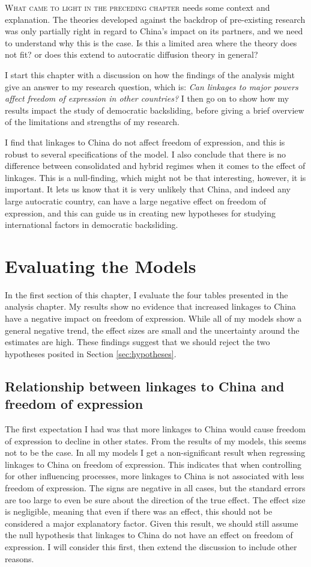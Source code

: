 \lettrine{W}{hat came to light in the preceding chapter} needs some context and explanation. The theories developed against the backdrop of pre-existing research was only partially right in regard to China's impact on its partners, and we need to understand why this is the case. Is this a limited area where the theory does not fit? or does this extend to autocratic diffusion theory in general?

I start this chapter with a discussion on how the findings of the analysis might give an answer to my research question, which is: \textit{Can linkages to major powers affect freedom of expression in other countries?} I then go on to show how my results impact the study of democratic backsliding, before giving a brief overview of the limitations and strengths of my research. 

I find that linkages to China do not affect freedom of expression, and this is robust to several specifications of the model. I also conclude that there is no difference between consolidated and hybrid regimes when it comes to the effect of linkages. This is a null-finding, which might not be that interesting, however, it is important. It lets us know that it is very unlikely that China, and indeed any large autocratic country, can have a large negative effect on freedom of expression, and this can guide us in creating new hypotheses for studying international factors in democratic backsliding. 

\section{Evaluating the Models}
In the first section of this chapter, I evaluate the four tables presented in the analysis chapter. My results show no evidence that increased linkages to China have a negative impact on freedom of expression. While all of my models show a general negative trend, the effect sizes are small and the uncertainty around the estimates are high. These findings suggest that we should reject the two hypotheses posited in Section \ref{sec:hypotheses}.

\subsection{Relationship between linkages to China and freedom of expression}
The first expectation I had was that more linkages to China would cause freedom of expression to decline in other states. From the results of my models, this seems not to be the case. In all my models  I get a non-significant result when regressing linkages to China on freedom of expression. This indicates that when controlling for other influencing processes, more linkages to China is not associated with less freedom of expression. The signs are negative in all cases, but the standard errors are too large to even be sure about the direction of the true effect. The effect size is negligible, meaning that even if there was an effect, this should not be considered a major explanatory factor. Given this result, we should still assume the null hypothesis that linkages to China do not have an effect on freedom of expression. I will consider this first, then extend the discussion to include other reasons. 

